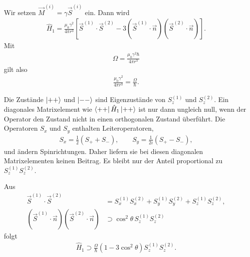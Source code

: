 \documentclass[11pt,a4paper]{scrartcl}
\newcommand{\op}[1]{\hat{#1}}
\begin{document}
\begin{enumerate}[label=(\alph*)]
        \begin{calculationbox}
            Wir setzen $\vec M^{(i)}=\gamma\vec S^{(i)}$ ein. Dann wird
            \begin{align*}
                \op H_1
                =
                \frac{\mu_0\gamma^2}{4\pi r^3}
                \left[
                    \vec S^{(1)}\cdot\vec S^{(2)}
                    -3(\vec S^{(1)}\cdot\vec n)(\vec S^{(2)}\cdot\vec n)
                \right].
            \end{align*}
            Mit
            \begin{align*}
                \Omega=\frac{\mu_0\gamma^2\hbar}{4\pi r^3}
            \end{align*}
            gilt also
            \begin{align*}
                \frac{\mu_0\gamma^2}{4\pi r^3}=\frac{\Omega}{\hbar}.
            \end{align*}

            \begin{calculationbox}[title=Warum nur $S_z^{(1)}S_z^{(2)}$ beiträgt]
                Die Zustände $\ket{++}$ und $\ket{--}$ sind Eigenzustände von $S_z^{(1)}$ und $S_z^{(2)}$. Ein diagonales Matrixelement wie $\bra{++}\op H_1\ket{++}$ ist nur dann ungleich null, wenn der Operator den Zustand nicht in einen orthogonalen Zustand überführt. Die Operatoren $S_x$ und $S_y$ enthalten Leiteroperatoren,
                \begin{align*}
                    S_x=\frac12(S_++S_-),
                    \qquad
                    S_y=\frac{1}{2i}(S_+-S_-),
                \end{align*}
                und ändern Spinrichtungen. Daher liefern sie bei diesen diagonalen Matrixelementen keinen Beitrag. Es bleibt nur der Anteil proportional zu $S_z^{(1)}S_z^{(2)}$.
            \end{calculationbox}

            \begin{calculationbox}[title=Relevanter Anteil des Störoperators]
                Aus
                \begin{align*}
                    \vec S^{(1)}\cdot\vec S^{(2)}
                    &=
                    S_x^{(1)}S_x^{(2)}+S_y^{(1)}S_y^{(2)}+S_z^{(1)}S_z^{(2)},\\
                    (\vec S^{(1)}\cdot\vec n)(\vec S^{(2)}\cdot\vec n)
                    &\supset
                    \cos^2\theta\,S_z^{(1)}S_z^{(2)}
                \end{align*}
                folgt
                \begin{align*}
                    \op H_1
                    \supset
                    \frac{\Omega}{\hbar}
                    (1-3\cos^2\theta)S_z^{(1)}S_z^{(2)}.
                \end{align*}
            \end{calculationbox}


\end{calculationbox}
\end{enumerate}
\end{document}
